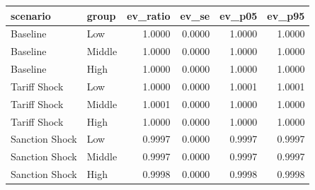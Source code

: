 \begin{tabular}{llrrrr}
\toprule
scenario & group & ev\_ratio & ev\_se & ev\_p05 & ev\_p95 \\
\midrule
Baseline & Low & 1.0000 & 0.0000 & 1.0000 & 1.0000 \\
Baseline & Middle & 1.0000 & 0.0000 & 1.0000 & 1.0000 \\
Baseline & High & 1.0000 & 0.0000 & 1.0000 & 1.0000 \\
Tariff Shock & Low & 1.0000 & 0.0000 & 1.0001 & 1.0001 \\
Tariff Shock & Middle & 1.0001 & 0.0000 & 1.0000 & 1.0000 \\
Tariff Shock & High & 1.0000 & 0.0000 & 1.0000 & 1.0000 \\
Sanction Shock & Low & 0.9997 & 0.0000 & 0.9997 & 0.9997 \\
Sanction Shock & Middle & 0.9997 & 0.0000 & 0.9997 & 0.9997 \\
Sanction Shock & High & 0.9998 & 0.0000 & 0.9998 & 0.9998 \\
\bottomrule
\end{tabular}
